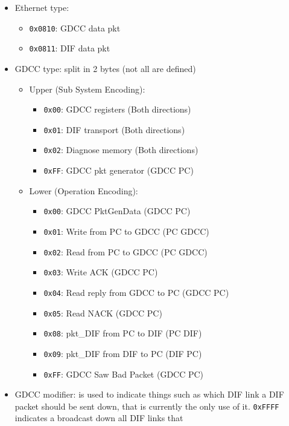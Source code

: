 \begin{itemize}
\item Ethernet type:
  \begin{itemize}
  \item \texttt{0x0810}: GDCC data pkt
  \item \texttt{0x0811}: DIF data pkt
  \end{itemize}
\item GDCC type: split in 2 bytes (not all are defined)
  \begin{itemize}
  \item Upper (Sub System Encoding):
    \begin{itemize}
    \item \texttt{0x00}: GDCC registers (Both directions)
    \item \texttt{0x01}: DIF transport (Both directions)
    \item \texttt{0x02}: Diagnose memory (Both directions)
    \item \texttt{0xFF}: GDCC pkt generator (GDCC \textrightarrow PC)
    \end{itemize}
  \item Lower (Operation Encoding):
    \begin{itemize}
    \item \texttt{0x00}: GDCC PktGenData (GDCC \textrightarrow PC)
    \item \texttt{0x01}: Write from PC to GDCC (PC \textrightarrow
      GDCC)
    \item \texttt{0x02}: Read from PC to GDCC (PC \textrightarrow
      GDCC)
    \item \texttt{0x03}: Write ACK (GDCC \textrightarrow PC)
    \item \texttt{0x04}: Read reply from GDCC to PC (GDCC
      \textrightarrow PC)
    \item \texttt{0x05}: Read NACK (GDCC \textrightarrow PC)
    \item \texttt{0x08}: pkt\_DIF from PC to DIF (PC \textrightarrow
      DIF)
    \item \texttt{0x09}: pkt\_DIF from DIF to PC (DIF \textrightarrow
      PC)
    \item \texttt{0xFF}: GDCC Saw Bad Packet (GDCC \textrightarrow PC)
    \end{itemize}
  \end{itemize}
\item GDCC modifier: is used to indicate things such as which DIF link
  a DIF packet should be sent down, that is currently the only use of
  it. \texttt{0xFFFF} indicates a broadcast down all DIF links that

\end{itemize}
